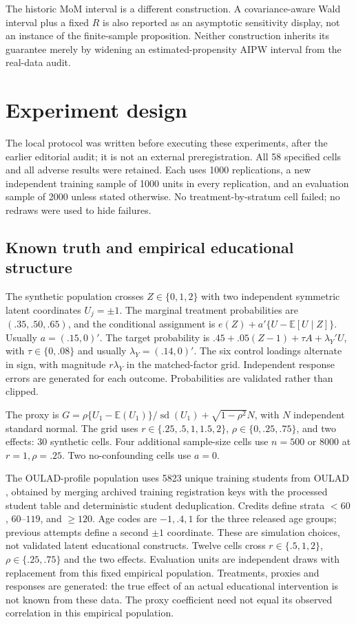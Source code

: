 \documentclass[11pt,a4paper]{article}
\newcommand{\E}{\mathbb E}
\begin{document}
The historic MoM interval is a different construction. A covariance-aware Wald interval plus a fixed $R$ is also reported as an asymptotic sensitivity display, not an instance of the finite-sample proposition. Neither construction inherits its guarantee merely by widening an estimated-propensity AIPW interval from the real-data audit.

\section{Experiment design}

The local protocol was written before executing these experiments, after the earlier editorial audit; it is not an external preregistration. All 58 specified cells and all adverse results were retained. Each uses 1000 replications, a new independent training sample of 1000 units in every replication, and an evaluation sample of 2000 unless stated otherwise. No treatment-by-stratum cell failed; no redraws were used to hide failures.

\subsection{Known truth and empirical educational structure}

The synthetic population crosses $Z\in\{0,1,2\}$ with two independent symmetric latent coordinates $U_j=\pm1$. The marginal treatment probabilities are $(.35,.50,.65)$, and the conditional assignment is $e(Z)+a'\{U-\E[U\mid Z]\}$. Usually $a=(.15,0)'$. The target probability is $.45+.05(Z-1)+\tau A+\lambda_Y'U$, with $\tau\in\{0,.08\}$ and usually $\lambda_Y=(.14,0)'$. The six control loadings alternate in sign, with magnitude $r\lambda_Y$ in the matched-factor grid. Independent response errors are generated for each outcome. Probabilities are validated rather than clipped.

The proxy is $G=\rho\{U_1-\E(U_1)\}/\operatorname{sd}(U_1)+\sqrt{1-\rho^2}N$, with $N$ independent standard normal. The grid uses $r\in\{.25,.5,1,1.5,2\}$, $\rho\in\{0,.25,.75\}$, and two effects: 30 synthetic cells. Four additional sample-size cells use $n=500$ or $8000$ at $r=1,\rho=.25$. Two no-confounding cells use $a=0$.

The OULAD-profile population uses 5823 unique training students from OULAD \cite{oulad}, obtained by merging archived training registration keys with the processed student table and deterministic student deduplication. Credits define strata $<60$, $60$--$119$, and $\ge120$. Age codes are $-1,.4,1$ for the three released age groups; previous attempts define a second $\pm1$ coordinate. These are simulation choices, not validated latent educational constructs. Twelve cells cross $r\in\{.5,1,2\}$, $\rho\in\{.25,.75\}$ and the two effects. Evaluation units are independent draws with replacement from this fixed empirical population. Treatments, proxies and responses are generated: the true effect of an actual educational intervention is not known from these data. The proxy coefficient need not equal its observed correlation in this empirical population.
\end{document}
